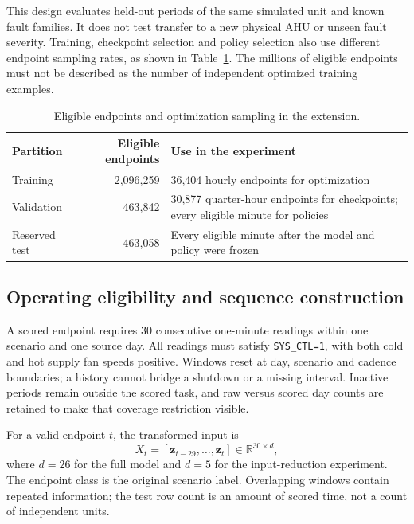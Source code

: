This design evaluates held-out periods of the same simulated unit and known fault families. It does not test transfer to a new physical AHU or unseen fault severity. Training, checkpoint selection and policy selection also use different endpoint sampling rates, as shown in Table~\ref{tab:new-split}. The millions of eligible endpoints must not be described as the number of independent optimized training examples.

\begin{table}[htbp]\centering\small
\caption{Eligible endpoints and optimization sampling in the extension.}\label{tab:new-split}
\begin{tabularx}{\linewidth}{l r X}
\toprule
Partition & Eligible endpoints & Use in the experiment \\
\midrule
Training & 2,096,259 & 36,404 hourly endpoints for optimization \\
Validation & 463,842 & 30,877 quarter-hour endpoints for checkpoints; every eligible minute for policies \\
Reserved test & 463,058 & Every eligible minute after the model and policy were frozen \\
\bottomrule\end{tabularx}
\end{table}

\subsection{Operating eligibility and sequence construction}
A scored endpoint requires 30 consecutive one-minute readings within one scenario and one source day. All readings must satisfy \texttt{SYS\_CTL=1}, with both cold and hot supply fan speeds positive. Windows reset at day, scenario and cadence boundaries; a history cannot bridge a shutdown or a missing interval. Inactive periods remain outside the scored task, and raw versus scored day counts are retained to make that coverage restriction visible.

For a valid endpoint $t$, the transformed input is
\begin{equation}
X_t=[\mathbf{z}_{t-29},\ldots,\mathbf{z}_{t}]\in\mathbb{R}^{30\times d},
\end{equation}
where $d=26$ for the full model and $d=5$ for the input-reduction experiment. The endpoint class is the original scenario label. Overlapping windows contain repeated information; the test row count is an amount of scored time, not a count of independent units.

